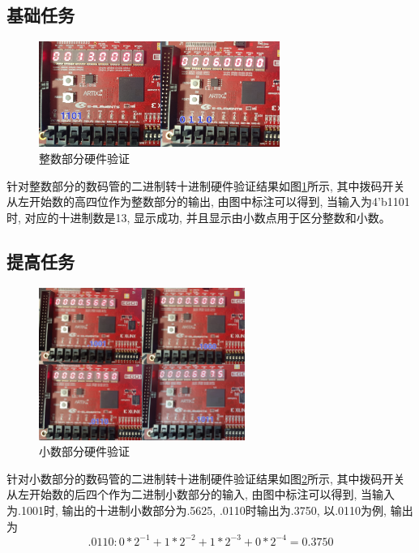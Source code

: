 \documentclass{article}
\begin{document}
\subsection*{基础任务}
\begin{figure}[H]
    \centering
    \includegraphics[width=0.7\textwidth]{image/2024-06-16-20-19-02.png}
    \caption{整数部分硬件验证}
    \label{image_int_hardware}
\end{figure}
针对整数部分的数码管的二进制转十进制硬件验证结果如图\ref{image_int_hardware}所示, 其中拨码开关从左开始数的高四位作为整数部分的输出, 
由图中标注可以得到, 当输入为4'b1101时, 对应的十进制数是13, 显示成功, 并且显示由小数点用于区分整数和小数。
\subsection*{提高任务}
\begin{figure}[H]
    \centering
    \includegraphics[width=0.6\textwidth]{image/2024-06-16-21-42-54.png}
    \caption{小数部分硬件验证}
    \label{image_float_hardware}
\end{figure}
针对小数部分的数码管的二进制转十进制硬件验证结果如图\ref{image_float_hardware}所示, 其中拨码开关从左开始数的后四个作为二进制小数部分的输入, 
由图中标注可以得到, 当输入为.1001时, 输出的十进制小数部分为.5625, .0110时输出为.3750, 以.0110为例, 输出为
$$.0110: 0*2^{-1} + 1*2^{-2} + 1*2^{-3} + 0*2^{-4} = 0.3750$$
\end{document}
